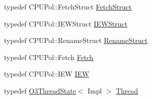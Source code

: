 \begin{DoxyCompactItemize}
\item 
typedef CPUPol::FetchStruct \hyperlink{classDefaultCommit_a3aac8607069f16898ef53cfaa2d97aeb}{FetchStruct}
\item 
typedef CPUPol::IEWStruct \hyperlink{classDefaultCommit_a7cf3f052f760b3a8a18623f792c10910}{IEWStruct}
\item 
typedef CPUPol::RenameStruct \hyperlink{classDefaultCommit_a0c2a89ad2edad9ad605d0461f9b132a5}{RenameStruct}
\item 
typedef CPUPol::Fetch \hyperlink{classDefaultCommit_aea27de1f675f508e1eb618ac115ce05c}{Fetch}
\item 
typedef CPUPol::IEW \hyperlink{classDefaultCommit_a2e298f790f528754f0e0ffa0cb8088f6}{IEW}
\item 
typedef \hyperlink{structO3ThreadState}{O3ThreadState}$<$ Impl $>$ \hyperlink{classDefaultCommit_ad5e0f9b655492f45720f8d756f11d3b5}{Thread}
\end{DoxyCompactItemize}
